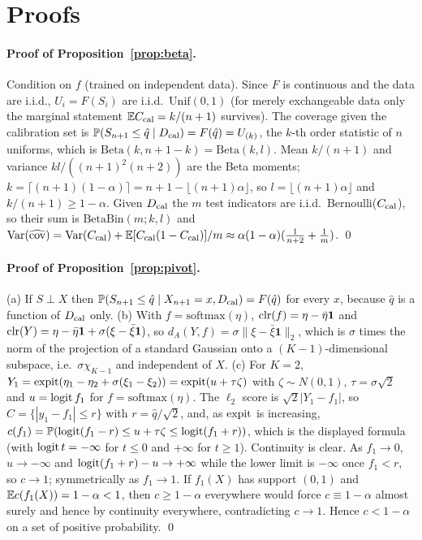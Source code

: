 \section{Proofs}
\label{app:proofs}

\paragraph{Proof of Proposition~\ref{prop:beta}.}
Condition on $f$ (trained on independent data). Since $F$ is continuous and the data are i.i.d., $U_i=F(S_i)$ are i.i.d.\ $\mathrm{Unif}(0,1)$ (for merely exchangeable data only the marginal statement $\E C_{\rm cal}=k/(n+1)$ survives). The coverage given the calibration set is $\Pr(S_{n+1}\le \hat q\mid D_{\rm cal})=F(\hat q)=U_{(k)}$, the $k$-th order statistic of $n$ uniforms, which is $\mathrm{Beta}(k,n+1-k)=\mathrm{Beta}(k,l)$. Mean $k/(n+1)$ and variance $kl/((n+1)^2(n+2))$ are the Beta moments; $k=\lceil(n+1)(1-\alpha)\rceil=n+1-\lfloor(n+1)\alpha\rfloor$, so $l=\lfloor(n+1)\alpha\rfloor$ and $k/(n+1)\ge1-\alpha$. Given $D_{\rm cal}$ the $m$ test indicators are i.i.d.\ Bernoulli($C_{\rm cal}$), so their sum is $\mathrm{BetaBin}(m;k,l)$ and $\mathrm{Var}(\widehat{\rm cov})=\mathrm{Var}(C_{\rm cal})+\E[C_{\rm cal}(1-C_{\rm cal})]/m\approx\alpha(1-\alpha)(\frac1{n+2}+\frac1m)$. \qed

\paragraph{Proof of Proposition~\ref{prop:pivot}.}
(a) If $S\perp X$ then $\Pr(S_{n+1}\le\hat q\mid X_{n+1}=x,D_{\rm cal})=F(\hat q)$ for every $x$, because $\hat q$ is a function of $D_{\rm cal}$ only. (b) With $f=\mathrm{softmax}(\eta)$, $\clr(f)=\eta-\bar\eta\mathbf1$ and $\clr(Y)=\eta-\bar\eta\mathbf1+\sigma(\xi-\bar\xi\mathbf1)$, so $d_A(Y,f)=\sigma\|\xi-\bar\xi\mathbf1\|_2$, which is $\sigma$ times the norm of the projection of a standard Gaussian onto a $(K-1)$-dimensional subspace, i.e.\ $\sigma\chi_{K-1}$ and independent of $X$. (c) For $K=2$, $Y_1=\expit(\eta_1-\eta_2+\sigma(\xi_1-\xi_2))=\expit(u+\tau\zeta)$ with $\zeta\sim N(0,1)$, $\tau=\sigma\sqrt2$ and $u=\logit f_1$ for $f=\mathrm{softmax}(\eta)$. The $\ell_2$ score is $\sqrt2|Y_1-f_1|$, so $C=\{|y_1-f_1|\le r\}$ with $r=\hat q/\sqrt2$, and, as $\expit$ is increasing, $c(f_1)=\Pr(\logit(f_1-r)\le u+\tau\zeta\le\logit(f_1+r))$, which is the displayed formula (with $\logit t=-\infty$ for $t\le0$ and $+\infty$ for $t\ge1$). Continuity is clear. As $f_1\to0$, $u\to-\infty$ and $\logit(f_1+r)-u\to+\infty$ while the lower limit is $-\infty$ once $f_1<r$, so $c\to1$; symmetrically as $f_1\to1$. If $f_1(X)$ has support $(0,1)$ and $\E c(f_1(X))=1-\alpha<1$, then $c\ge1-\alpha$ everywhere would force $c\equiv1-\alpha$ almost surely and hence by continuity everywhere, contradicting $c\to1$. Hence $c<1-\alpha$ on a set of positive probability. \qed


